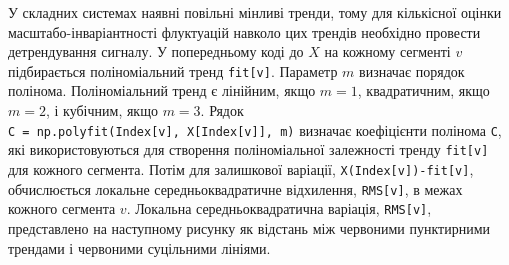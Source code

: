 \documentclass[
  letterpaper,
]{report}
\begin{document}
У складних системах наявні повільні мінливі тренди, тому для кількісної
оцінки масштабо-інваріантності флуктуацій навколо цих трендів необхідно
провести детрендування сигналу. У попередньому коді до \(X\) на кожному
сегменті \(v\) підбирається поліноміальний тренд \texttt{fit{[}v{]}}.
Параметр \(m\) визначає порядок полінома. Поліноміальний тренд є
лінійним, якщо \(m = 1\), квадратичним, якщо \(m = 2\), і кубічним, якщо
\(m = 3\). Рядок
\texttt{C\ =\ np.polyfit(Index{[}v{]},\ X{[}Index{[}v{]}{]},\ m)}
визначає коефіцієнти полінома \texttt{C}, які використовуються для
створення поліноміальної залежності тренду \texttt{fit{[}v{]}} для
кожного сегмента. Потім для залишкової варіації,
\texttt{X(Index{[}v{]})-fit{[}v{]}}, обчислюється локальне
середньоквадратичне відхилення, \texttt{RMS{[}v{]}}, в межах кожного
сегмента \(v\). Локальна середньоквадратична варіація,
\texttt{RMS{[}v{]}}, представлено на наступному рисунку як відстань між
червоними пунктирними трендами і червоними суцільними лініями.
\end{document}
